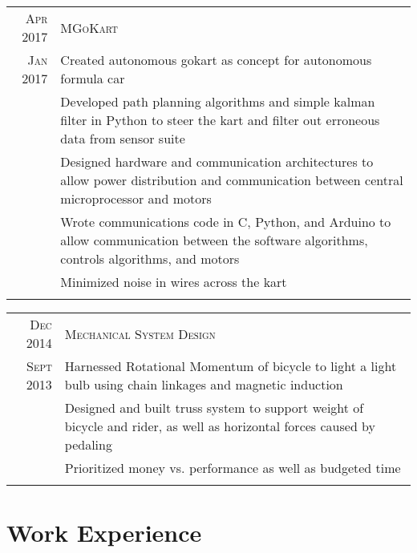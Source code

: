 \documentclass[a4paper,11pt]{article} %
\begin{document}
\begin{tabular}{r|p{13cm}}
\hspace{4pt}\textsc{Apr 2017} & \textsc{MGoKart} \\
\textsc{Jan 2017} & \footnotesize{Created autonomous gokart as concept for autonomous formula car} \\
& \footnotesize{Developed path planning algorithms and simple kalman filter in
  Python to steer the kart and filter out erroneous data from sensor suite} \\
& \footnotesize{Designed hardware and communication architectures to allow
  power distribution and communication between central microprocessor and motors} \\
& \footnotesize{Wrote communications code in C, Python, and Arduino to allow
  communication between the software algorithms, controls algorithms, and motors} \\
& \footnotesize{Minimized noise in wires across the kart} \\
\multicolumn{2}{c}{} \\
\end{tabular}


\begin{tabular}{r|p{13cm}}
\textsc{Dec	2014} & \textsc{Mechanical System Design} \\
\textsc{Sept 2013} & \footnotesize{Harnessed Rotational Momentum of bicycle to
  light a light bulb using chain linkages and magnetic induction} \\
& \footnotesize{Designed and built truss system to support weight of bicycle
  and rider, as well as horizontal forces caused by pedaling} \\
& \footnotesize{Prioritized money vs. performance as well as budgeted time} \\
\multicolumn{2}{c}{} \\
\end{tabular}


\section{Work Experience}
\end{document}
